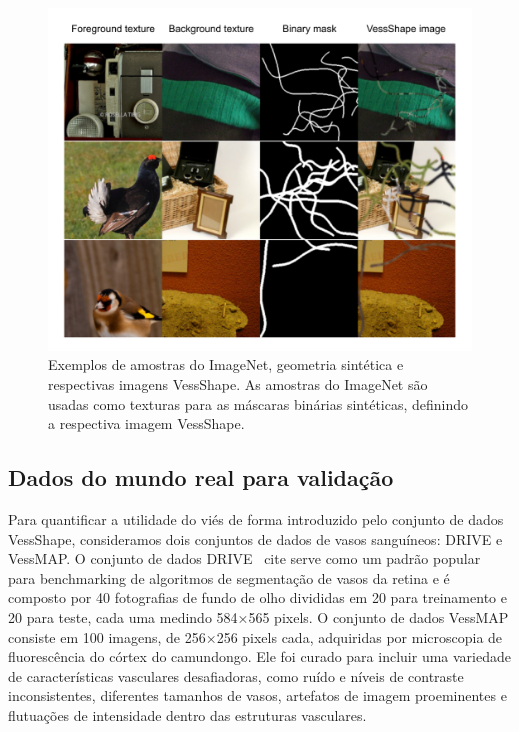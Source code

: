 \documentclass[%
reprint,
nofootinbib,
 amsmath,amssymb,
aps,
superscriptaddress,
showkeys,
longbibliography
]{revtex4-1}
\begin{document}
\begin{figure}[tbp]
    \centering
    \includegraphics[width=\columnwidth]{figures/results/vessshape_sample.pdf}
    \caption{Exemplos de amostras do ImageNet, geometria sintética e respectivas imagens VessShape. As amostras do ImageNet são usadas como texturas para as máscaras binárias sintéticas, definindo a respectiva imagem VessShape.}
    \label{f:vessshape_sample}
\end{figure}

\subsection{Dados do mundo real para validação}

Para quantificar a utilidade do viés de forma introduzido pelo conjunto de dados VessShape, consideramos dois conjuntos de dados de vasos sanguíneos: DRIVE e VessMAP. O conjunto de dados DRIVE~
cite{} serve como um padrão popular para benchmarking de algoritmos de segmentação de vasos da retina e é composto por 40 fotografias de fundo de olho divididas em 20 para treinamento e 20 para teste, cada uma medindo 584×565 pixels. O conjunto de dados VessMAP consiste em 100 imagens, de 256×256 pixels cada, adquiridas por microscopia de fluorescência do córtex do camundongo. Ele foi curado para incluir uma variedade de características vasculares desafiadoras, como ruído e níveis de contraste inconsistentes, diferentes tamanhos de vasos, artefatos de imagem proeminentes e flutuações de intensidade dentro das estruturas vasculares.
\end{document}
